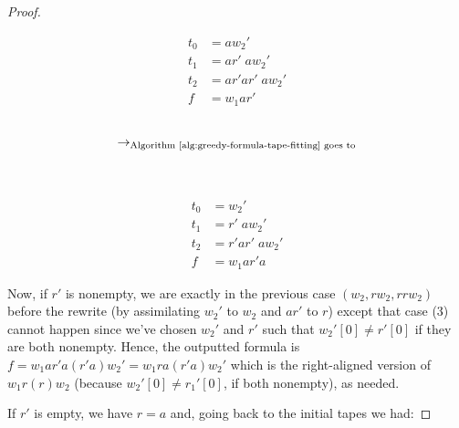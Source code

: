 \begin{proof}
    \setlength{\columnsep}{-7.5cm}
    \begin{multicols}{3}
        \noindent
        \begin{align*}
            t_0 & = a w_2'            \\
            t_1 & = ar'\;  a w_2'     \\
            t_2 & = ar' ar'\;  a w_2' \\
            f   & = w_1 ar'
        \end{align*}
        \begin{align*}
             &                                                                   \\
            \to_{\text{Algorithm~\ref{alg:greedy-formula-tape-fitting} goes to}} \\
             &                                                                   \\
             &
        \end{align*}
        \begin{align*}
            t_0 & = w_2'             \\
            t_1 & = r'\;  a w_2'     \\
            t_2 & = r' ar'\;  a w_2' \\
            f   & = w_1 ar' a
        \end{align*}
    \end{multicols}



    Now, if $r'$ is nonempty, we are exactly in the previous case $(w_2,rw_2,rrw_2)$ before the rewrite (by assimilating  $w_2'$ to $w_2$ and $ar'$ to $r$) except that case (3) cannot happen since we've chosen $w_2'$ and $r'$ such that $w_2'[0] \neq r'[0]$ if they are both nonempty. Hence, the outputted formula is $f = w_1 a r' a (r' a) w_2' = w_1 r a (r' a) w_2'$  which is the right-aligned version of $w_1r(r)w_2$ (because $w_2'[0] \neq r_1'[0]$, if both nonempty), as needed.

    If $r'$ is empty, we have $r = a$ and, going back to the initial tapes we had:



\end{proof}
